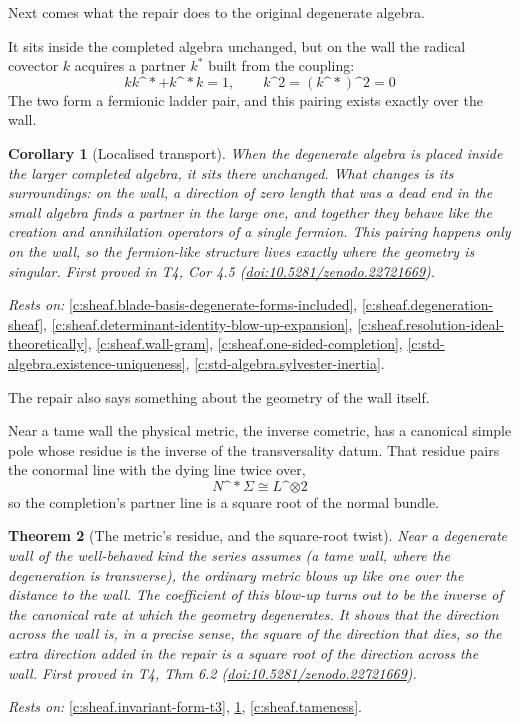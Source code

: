 \documentclass[11pt]{article}
\newtheorem{theorem}{Theorem}[section]
\newtheorem{corollary}[theorem]{Corollary}
\theoremstyle{definition}
\theoremstyle{plain}
\providecommand{\Sig}{}\renewcommand{\Sig}{\Sigma}
\providecommand{\shL}{}\renewcommand{\shL}{L}
\begin{document}
Next comes what the repair does to the original degenerate algebra.

It sits inside the completed algebra unchanged, but on the wall the radical covector $k$ acquires a partner $k^*$ built from the coupling: \[ k k\^{}* + k\^{}* k = 1, \qquad k\^{}2 = (k\^{}*)\^{}2 = 0 \] The two form a fermionic ladder pair, and this pairing exists exactly over the wall.

\begin{corollary}[Localised transport]\label{c:sheaf.localised-transport}
When the degenerate algebra is placed inside the larger completed algebra, it sits there unchanged. What changes is its surroundings: on the wall, a direction of zero length that was a dead end in the small algebra finds a partner in the large one, and together they behave like the creation and annihilation operators of a single fermion. This pairing happens only on the wall, so the fermion-like structure lives exactly where the geometry is singular.
\emph{First proved in} T4, Cor 4.5 (\href{https://doi.org/10.5281/zenodo.22721669}{doi:10.5281/zenodo.22721669}).
\end{corollary}
\noindent\emph{Rests on:} \ref{c:sheaf.blade-basis-degenerate-forms-included}, \ref{c:sheaf.degeneration-sheaf}, \ref{c:sheaf.determinant-identity-blow-up-expansion}, \ref{c:sheaf.resolution-ideal-theoretically}, \ref{c:sheaf.wall-gram}, \ref{c:sheaf.one-sided-completion}, \ref{c:std-algebra.existence-uniqueness}, \ref{c:std-algebra.sylvester-inertia}.

The repair also says something about the geometry of the wall itself.

Near a tame wall the physical metric, the inverse cometric, has a canonical simple pole whose residue is the inverse of the transversality datum. That residue pairs the conormal line with the dying line twice over, \[ N\^{}*\Sig \cong \shL\^{}{\otimes 2} \] so the completion's partner line is a square root of the normal bundle.

\begin{theorem}[The metric's residue, and the square-root twist]\label{c:sheaf.metrics-residue-square-root-twist}
Near a degenerate wall of the well-behaved kind the series assumes (a tame wall, where the degeneration is transverse), the ordinary metric blows up like one over the distance to the wall. The coefficient of this blow-up turns out to be the inverse of the canonical rate at which the geometry degenerates. It shows that the direction across the wall is, in a precise sense, the square of the direction that dies, so the extra direction added in the repair is a square root of the direction across the wall.
\emph{First proved in} T4, Thm 6.2 (\href{https://doi.org/10.5281/zenodo.22721669}{doi:10.5281/zenodo.22721669}).
\end{theorem}
\noindent\emph{Rests on:} \ref{c:sheaf.invariant-form-t3}, \ref{c:sheaf.localised-transport}, \ref{c:sheaf.tameness}.
\end{document}
